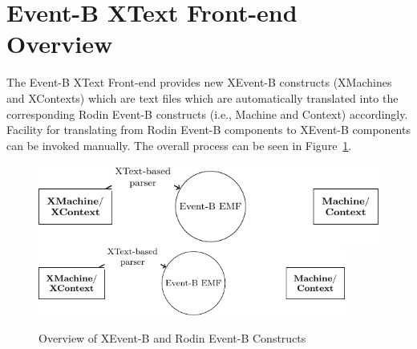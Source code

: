 \section{Event-B XText Front-end Overview}
\label{sec:overview}

The Event-B XText Front-end provides new XEvent-B constructs (XMachines and XContexts) which are text files which are automatically translated into the corresponding Rodin Event-B constructs (i.e., Machine and Context) accordingly.  Facility for translating from Rodin Event-B components to XEvent-B components can be invoked manually. The overall process can be seen in Figure~\ref{fig:overview}.
\begin{figure}[!htbp]
  \centering
  \ifplastex
  \includegraphics[width=512]{tikz-overview}
  \else
  \includegraphics[width=0.9\textwidth]{tikz-overview}
  \fi
  \caption{Overview of XEvent-B and Rodin Event-B Constructs}
  \label{fig:overview}
\end{figure}

